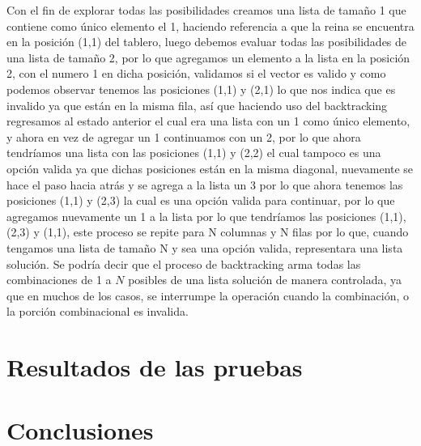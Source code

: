 \documentclass[12pt,a4paper]{article}
\begin{document}
\begin{enumerate}
Con el fin de explorar todas las posibilidades creamos una lista de tamaño 1 que contiene como único elemento el 1, haciendo referencia a que la reina se encuentra en la posición (1,1) del tablero, luego debemos evaluar todas las posibilidades de una lista de tamaño 2, por lo que agregamos un elemento a la lista en la posición 2, con el numero 1 en dicha posición,  validamos si el vector es valido y como podemos observar tenemos las posiciones (1,1) y (2,1) lo que nos indica que es invalido ya que están en la misma fila, así que haciendo uso del backtracking regresamos al estado anterior el cual era una lista con un 1 como único elemento, y ahora en vez de agregar un 1 continuamos con un 2, por lo que ahora tendríamos una lista con las posiciones (1,1) y (2,2) el cual tampoco es una opción valida ya que dichas posiciones están en la misma diagonal, nuevamente se hace el paso hacia atrás y se agrega a la lista un 3 por lo que ahora tenemos las posiciones (1,1) y (2,3) la cual es una opción valida para continuar, por lo que agregamos nuevamente un 1 a la lista por lo que tendríamos las posiciones (1,1), (2,3) y (1,1), este proceso se repite para N columnas y N filas por lo que, cuando tengamos una lista de tamaño N y sea una opción valida, representara una lista solución. Se podría decir que el proceso de backtracking arma todas las combinaciones de 1 a $N$ posibles de una lista solución de manera controlada, ya que en muchos de los casos, se interrumpe la operación cuando la combinación, o la porción combinacional es invalida.

\end{enumerate}

\pagebreak
\section{Resultados de las pruebas}


\pagebreak
\section{Conclusiones}
\end{document}
